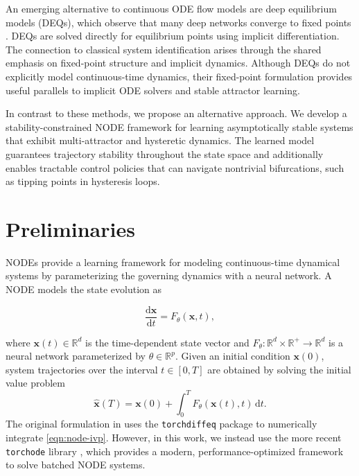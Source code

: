 \documentclass[11pt,twoside]{article}
\theoremstyle{plain}
\theoremstyle{definition}
\theoremstyle{remark}
\newcommand{\vect}[1]{\boldsymbol{#1}}
\newcommand{\R}{\mathbb{R}}
\begin{document}
An emerging alternative to continuous ODE flow models are deep equilibrium models (DEQs), which observe that many deep networks converge to fixed points \cite{bai2019deepequilibriummodels}. DEQs are solved directly for equilibrium points using implicit differentiation. The connection to classical system identification arises through the shared emphasis on fixed-point structure and implicit dynamics. Although DEQs do not explicitly model continuous-time dynamics, their fixed-point formulation provides useful parallels to implicit ODE solvers and stable attractor learning.

In contrast to these methods, we propose an alternative approach. We develop a stability-constrained NODE framework for learning asymptotically stable systems that exhibit multi-attractor and hysteretic dynamics. The learned model guarantees trajectory stability throughout the state space and additionally enables tractable control policies that can navigate nontrivial bifurcations, such as tipping points in hysteresis loops. 


\section{Preliminaries}
NODEs provide a learning framework for modeling continuous-time dynamical systems by parameterizing the governing dynamics with a neural network. A NODE models the state evolution as

\begin{equation}
    \frac{\mathrm{d}\vect{x}}{\mathrm{d}t} = F_\theta(\vect{x}, t),
    \label{eqn:gen-node}
\end{equation}

where \(\vect{x}(t) \in \mathbb{R}^d\) is the time-dependent state vector and \(F_\theta : \mathbb{R}^d \times \mathbb{R}^+ \to \mathbb{R}^d\) is a neural network parameterized by \(\theta \in \R^p\). Given an initial condition \(\vect{x}(0)\), system trajectories over the interval \(t \in [0, T]\) are obtained by solving the initial value problem
\begin{equation}
    \widehat{\vect{x}}(T) = \vect{x}(0) + \int_0^T F_\theta(\vect{x}(t), t)\, \mathrm{d}t.
    \label{eqn:node-ivp}
\end{equation}
The original formulation in \cite{chen2018neural} uses the \texttt{torchdiffeq} package to numerically integrate \cref{eqn:node-ivp}. However, in this work, we instead use the more recent \texttt{torchode} library \cite{Lienen_torchode_A_Parallel_2022}, which provides a modern, performance-optimized framework to solve batched NODE systems.
\end{document}
